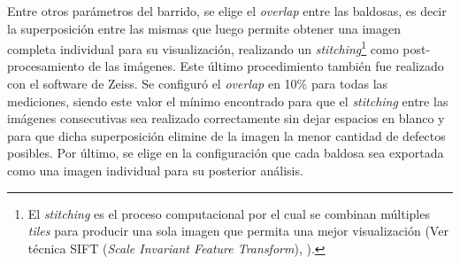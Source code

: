 Entre otros parámetros del barrido, se elige el \textit{overlap} entre las baldosas, es decir la superposición entre las mismas que luego permite obtener una imagen completa individual para su visualización,  realizando un \textit{stitching}\footnote{El \textit{stitching} es el proceso computacional por el cual se combinan múltiples \textit{tiles} para
producir una sola imagen que permita una mejor visualización (Ver técnica SIFT (\textit{Scale Invariant Feature Transform}), \cite{Lowe}).} como post-procesamiento de las imágenes. Este último procedimiento también fue realizado con el software de Zeiss. Se configuró el \textit{overlap} en 10$\%$ para todas las mediciones, siendo este valor el mínimo encontrado para que el \textit{stitching} entre las imágenes consecutivas sea realizado correctamente sin dejar espacios en blanco y para que dicha superposición elimine de la imagen la menor cantidad de defectos posibles. Por último, se elige en la configuración que cada baldosa sea exportada como una imagen individual para su posterior análisis.

